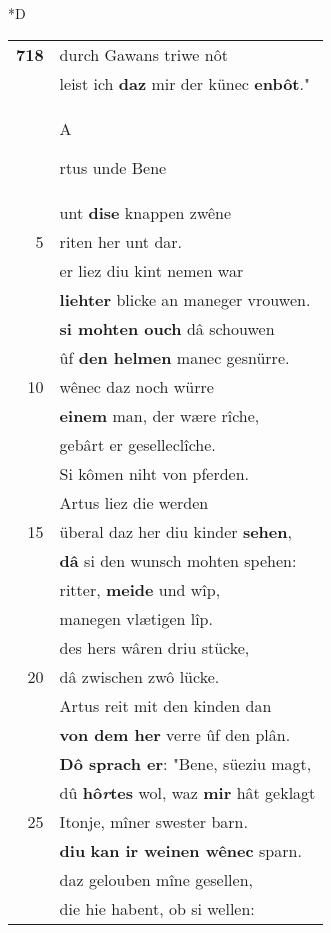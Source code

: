 \documentclass[8pt,a4paper,notitlepage]{article}
\begin{document}
\begin{table}[ht]
\begin{minipage}[t]{0.5\linewidth}
\small
\begin{center}*D
\end{center}
\begin{tabular}{rl}
\textbf{718} & durch Gawans triwe nôt\\ 
 & leist ich \textbf{daz} mir der künec \textbf{enbôt}."\\ 
 & \begin{large}A\end{large}rtus unde Bene\\ 
 & unt \textbf{dise} knappen zwêne\\ 
5 & riten her unt dar.\\ 
 & er liez diu kint nemen war\\ 
 & \textbf{liehter} blicke an maneger vrouwen.\\ 
 & \textbf{si mohten ouch} dâ schouwen\\ 
 & ûf \textbf{den helmen} manec gesnürre.\\ 
10 & wênec daz noch würre\\ 
 & \textbf{einem} man, der wære rîche,\\ 
 & gebârt er geselleclîche.\\ 
 & Si kômen niht von pferden.\\ 
 & Artus liez die werden\\ 
15 & überal daz her diu kinder \textbf{sehen},\\ 
 & \textbf{dâ} si den wunsch mohten spehen:\\ 
 & ritter, \textbf{meide} und wîp,\\ 
 & manegen vlætigen lîp.\\ 
 & des hers wâren driu stücke,\\ 
20 & dâ zwischen zwô lücke.\\ 
 & Artus reit mit den kinden dan\\ 
 & \textbf{von dem her} verre ûf den plân.\\ 
 & \textbf{Dô sprach er}: "Bene, süeziu magt,\\ 
 & dû \textbf{hô\textit{r}tes} wol, waz \textbf{mir} hât geklagt\\ 
25 & Itonje, mîner swester barn.\\ 
 & \textbf{diu} \textbf{kan ir weinen wênec} sparn.\\ 
 & daz gelouben mîne gesellen,\\ 
 & die hie habent, ob si wellen:\\ 

\end{tabular}
\end{minipage}
\end{table}
\end{document}
